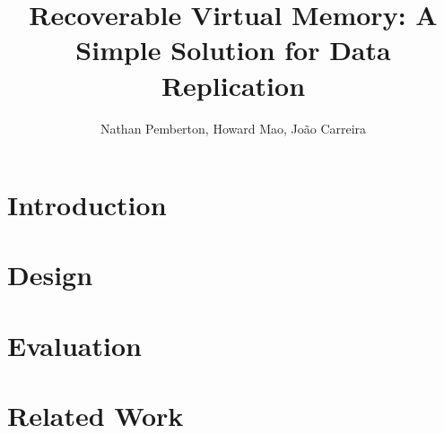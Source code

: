 \documentclass[10pt,twocolumn]{article}
\begin{document}
\title{{\bf Recoverable Virtual Memory: A Simple Solution for Data Replication}}
\author{
    Nathan Pemberton, Howard Mao, Jo\~{a}o Carreira
}
\maketitle

\begin{abstract}

\end{abstract}

\section{Introduction}

\section{Design}

\section{Evaluation}

\section{Related Work}

%
%



\end{document}
